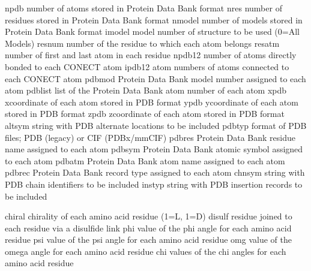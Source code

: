 \documentclass[letterpaper,11pt,english]{sphinxmanual}
\begin{document}
\begin{sphinxVerbatim}[commandchars=\\\{\}]
npdb            number of atoms stored in Protein Data Bank format
nres            number of residues stored in Protein Data Bank format
nmodel          number of models stored in Protein Data Bank format
imodel          model number of structure to be used (0=All Models)
resnum          number of the residue to which each atom belongs
resatm          number of first and last atom in each residue
npdb12          number of atoms directly bonded to each CONECT atom
ipdb12          atom numbers of atoms connected to each CONECT atom
pdbmod          Protein Data Bank model number assigned to each atom
pdblist         list of the Protein Data Bank atom number of each atom
xpdb            x\PYGZhy{}coordinate of each atom stored in PDB format
ypdb            y\PYGZhy{}coordinate of each atom stored in PDB format
zpdb            z\PYGZhy{}coordinate of each atom stored in PDB format
altsym          string with PDB alternate locations to be included
pdbtyp          format of PDB files; PDB (legacy) or CIF (PDBx/mmCIF)
pdbres          Protein Data Bank residue name assigned to each atom
pdbsym          Protein Data Bank atomic symbol assigned to each atom
pdbatm          Protein Data Bank atom name assigned to each atom
pdbrec          Protein Data Bank record type assigned to each atom
chnsym          string with PDB chain identifiers to be included
instyp          string with PDB insertion records to be included
\end{sphinxVerbatim}

\sphinxAtStartPar
{}

\begin{sphinxVerbatim}[commandchars=\\\{\}]
chiral          chirality of each amino acid residue (1=L, \PYGZhy{}1=D)
disulf          residue joined to each residue via a disulfide link
phi             value of the phi angle for each amino acid residue
psi             value of the psi angle for each amino acid residue
omg             value of the omega angle for each amino acid residue
chi             values of the chi angles for each amino acid residue
\end{sphinxVerbatim}

\sphinxAtStartPar
{}
\end{document}

